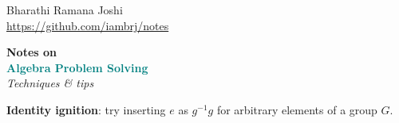 \documentclass[titlepage, 12pt]{article}
\newcommand*{\logo}{\fbox{$\mathfrak{BRJ}$}}
\begin{document}
\begin{titlepage}

	\raggedleft

	\vspace*{\baselineskip}

	{Bharathi Ramana Joshi\\\url{https://github.com/iambrj/notes}}

	\vspace*{0.167\textheight}

	\textbf{\LARGE Notes on}\\[\baselineskip]

	\textbf{\textcolor{teal}{\huge Algebra Problem Solving}}\\[\baselineskip]

    {\Large \textit{Techniques \& tips}}

	\vfill

	{\large \logo}

	\vspace*{3\baselineskip}

\end{titlepage}

\newpage

\begin{technique}{}{}
    \textbf{Identity ignition}: try inserting $e$ as $g^{-1}g$ for arbitrary
    elements of a group $G$.
\end{technique}
\end{document}
